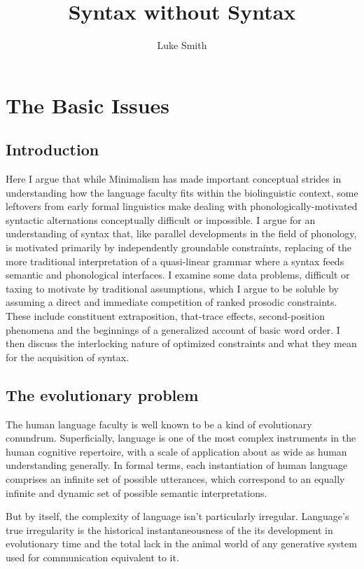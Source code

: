 \documentclass{article}
\title{Syntax without Syntax}
\author{Luke Smith}
\newcommand{\TT}{that-trace effect}
\begin{document}
\maketitle

\section{The Basic Issues}

\subsection{Introduction}
Here I argue that while Minimalism has made important conceptual strides in understanding how the language faculty fits within the biolinguistic context, some leftovers from early formal linguistics make dealing with phonologically-motivated syntactic alternations conceptually difficult or impossible. I argue for an understanding of syntax that, like parallel developments in the field of phonology, is motivated primarily by independently groundable constraints, replacing of the more traditional interpretation of a quasi-linear grammar where a syntax feeds semantic and phonological interfaces. I examine some data problems, difficult or taxing to motivate by traditional assumptions, which I argue to be soluble by assuming a direct and immediate competition of ranked prosodic constraints. These include constituent extraposition, {\TT}s, second-position phenomena and the beginnings of a generalized account of basic word order. I then discuss the interlocking nature of optimized constraints and what they mean for the acquisition of syntax.




\subsection{The evolutionary problem}

The human language faculty is well known to be a kind of evolutionary conundrum. Superficially, language is one of the most complex instruments in the human cognitive repertoire, with a scale of application about as wide as human understanding generally. In formal terms, each instantiation of human language comprises an infinite set of possible utterances, which correspond to an equally infinite and dynamic set of possible semantic interpretations.

But by itself, the complexity of language isn't particularly irregular. Language's true irregularity is the historical instantaneousness of the its development in evolutionary time and the total lack in the animal world of any generative system used for communication equivalent to it.
\end{document}

